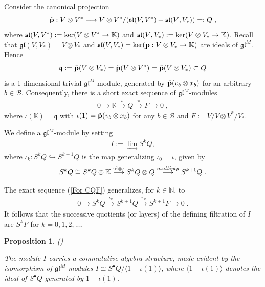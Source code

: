 \documentclass[12pt]{article}
\def\KK {{\mathbb K}}     %
\def\NN {{\mathbb N}}     %
\def\B  {\mathcal B}
\def\lw  {\longrightarrow}
\def\mk {\mathfrak}
\newtheorem{prop}[theorem]{Proposition}
\begin{document}
Consider the canonical projection
\begin{gather}\label{For ptilde Q}
\tilde{\bf p}:\bar V \otimes V^*\lw \bar V\otimes V^*/(\mk{sl}(V,V^*)+\mk{sl}(\bar V,V_*)) =:Q \;,
\end{gather}
where $\mk{sl}(V,V^*):={\rm ker}(V\otimes V^*\to \KK)$ and $\mk{sl}(\bar V,V_*):={\rm ker}(\bar V\otimes V_*\to \KK)$.
Recall that $\mk{gl}(V,V_*)=V\otimes V_*$ and $\mk{sl}(V,V_*)={\rm ker}({\bf p}:V\otimes V_*\to\KK)$ are ideals of $\mk{gl}^M$. Hence
$$
\mk q:=\tilde{\bf p}(V\otimes V_*)=\tilde{\bf p}(V\otimes V^*)=\tilde{\bf p}(\bar V\otimes V_*) \subset Q 
$$
is a 1-dimensional trivial $\mk{gl}^M$-module, generated by $\tilde{\bf p}(v_b\otimes x_b)$ for an arbitrary $b\in\B$. Consequently, there is a short exact sequence of $\mk{gl}^M$-modules
\begin{gather}\label{For CQF}
0 \lw \KK \stackrel{\iota}{\lw} Q \stackrel{\pi}{\lw} F \lw 0 \;,
\end{gather}
where $\iota(\KK)=\mk q$ with $\iota(1)=\tilde{\bf p}(v_b\otimes x_b)$ for any $b\in\B$ and $F:=\bar V/V \otimes V^*/V_*$.

We define a $\mk{gl}^M$-module by setting
\begin{gather}\label{For I}
I:=\lim\limits_{\lw} S^kQ ,
\end{gather}
where $\iota_k:S^kQ\hookrightarrow S^{k+1}Q$ is the map generalizing $\iota_0=\iota$, given by
$$
S^kQ\cong S^kQ\otimes\KK \stackrel{{\rm id}\otimes \iota}{\lw} S^kQ \otimes Q \stackrel{multiply}{\lw} S^{k+1}Q \;.
$$

The exact sequence (\ref{For CQF}) generalizes, for $k\in\NN$, to
\begin{gather}\label{For SkCQF}
0 \lw S^kQ \stackrel{\iota_k}{\lw} S^{k+1}Q \stackrel{\pi_k}{\lw} S^{k+1}F \lw 0 \;.
\end{gather}
It follows that the successive quotients (or layers) of the defining filtration of $I$ are $S^{k}F$ for $k=0,1,2,...$.

\begin{prop}\label{Prop I is algebra} (\cite{Chirvasitu-Penkov-UTC})

The module $I$ carries a commutative algebra structure, made evident by the isomorphism of $\mk{gl}^M$-modules $I\cong S^\bullet Q/\langle 1-\iota(1)\rangle$, where $\langle 1-\iota(1)\rangle$ denotes the ideal of $S^\bullet Q$ generated by $1-\iota(1)$.
\end{prop}
\end{document}
